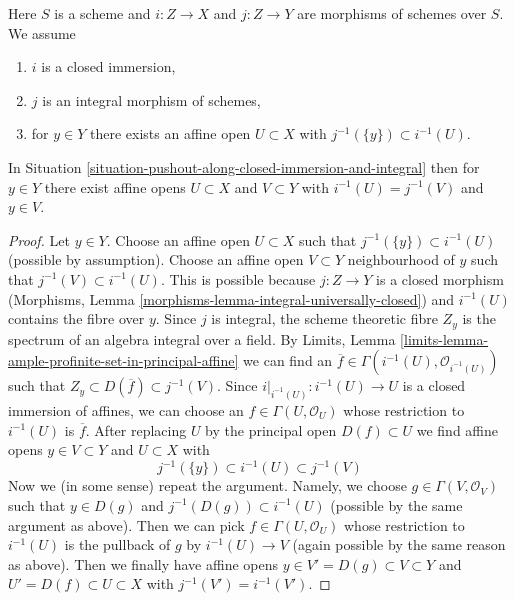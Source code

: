 \begin{situation}
\label{situation-pushout-along-closed-immersion-and-integral}
Here $S$ is a scheme and $i : Z \to X$ and $j : Z \to Y$
are morphisms of schemes over $S$. We assume
\begin{enumerate}
\item $i$ is a closed immersion,
\item $j$ is an integral morphism of schemes,
\item for $y \in Y$ there exists an affine open $U \subset X$
with $j^{-1}(\{y\}) \subset i^{-1}(U)$.
\end{enumerate}
\end{situation}

\begin{lemma}
\label{lemma-prepare-pushout-along-closed-immersion-and-integral}
In Situation \ref{situation-pushout-along-closed-immersion-and-integral}
then for $y \in Y$ there exist affine opens $U \subset X$ and
$V \subset Y$ with $i^{-1}(U) = j^{-1}(V)$ and $y \in V$.
\end{lemma}

\begin{proof}
Let $y \in Y$. Choose an affine open $U \subset X$
such that $j^{-1}(\{y\}) \subset i^{-1}(U)$ (possible by assumption).
Choose an affine open $V \subset Y$ neighbourhood of $y$
such that $j^{-1}(V) \subset i^{-1}(U)$.
This is possible because $j : Z \to Y$ is a closed morphism
(Morphisms, Lemma \ref{morphisms-lemma-integral-universally-closed}) and
$i^{-1}(U)$ contains the fibre over $y$.
Since $j$ is integral, the scheme theoretic fibre $Z_y$
is the spectrum of an algebra integral over a field.
By Limits, Lemma \ref{limits-lemma-ample-profinite-set-in-principal-affine}
we can find an $\overline{f} \in \Gamma(i^{-1}(U), \mathcal{O}_{i^{-1}(U)})$
such that $Z_y \subset D(\overline{f}) \subset j^{-1}(V)$.
Since $i|_{i^{-1}(U)} : i^{-1}(U) \to U$ is a closed immersion
of affines, we can choose an $f \in \Gamma(U, \mathcal{O}_U)$
whose restriction to $i^{-1}(U)$ is $\overline{f}$.
After replacing $U$ by the principal open $D(f) \subset U$
we find affine opens $y \in V \subset Y$ and $U \subset X$ with
$$
j^{-1}(\{y\}) \subset i^{-1}(U) \subset j^{-1}(V)
$$
Now we (in some sense) repeat the argument. Namely, we choose
$g \in \Gamma(V, \mathcal{O}_V)$ such that $y \in D(g)$ and
$j^{-1}(D(g)) \subset i^{-1}(U)$ (possible by the same argument
as above). Then we can pick $f \in \Gamma(U, \mathcal{O}_U)$
whose restriction to $i^{-1}(U)$ is the pullback of $g$
by $i^{-1}(U) \to V$ (again possible by the same reason as above).
Then we finally have affine opens $y \in V' = D(g) \subset V \subset Y$
and $U' = D(f) \subset U \subset X$ with $j^{-1}(V') = i^{-1}(V')$.
\end{proof}

